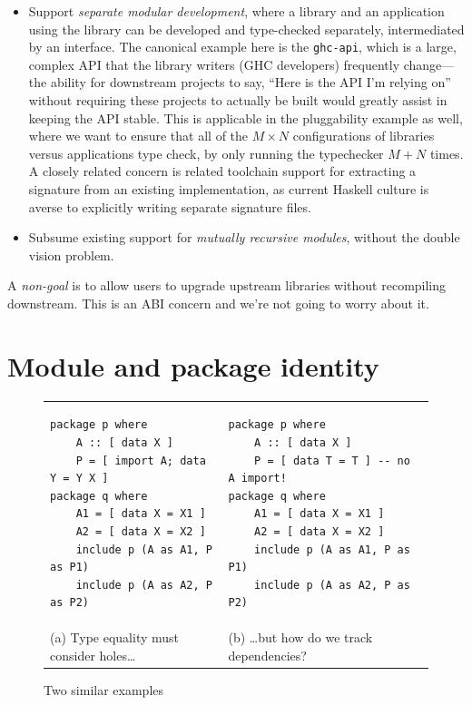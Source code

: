 \documentclass{article}
\begin{document}
\begin{itemize}
    \item Support \emph{separate modular development}, where a library and
        an application using the library can be developed and type-checked
        separately, intermediated by an interface.  The canonical example
        here is the \verb|ghc-api|, which is a large, complex API that
        the library writers (GHC developers) frequently change---the ability
        for downstream projects to say, ``Here is the API I'm relying on''
        without requiring these projects to actually be built would greatly
        assist in keeping the API stable. This is applicable in
        the pluggability example as well, where we want to ensure that all
        of the $M \times N$ configurations of libraries versus applications
        type check, by only running the typechecker $M + N$ times.  A closely
        related concern is related toolchain support for extracting a signature
        from an existing implementation, as current Haskell culture is averse
        to explicitly writing separate signature files.

    \item Subsume existing support for \emph{mutually recursive modules},
        without the double vision problem.
\end{itemize}

A \emph{non-goal} is to allow users to upgrade upstream libraries
without recompiling downstream. This is an ABI concern and we're not
going to worry about it.

\clearpage

\section{Module and package identity}

\begin{figure}[H]
\begin{tabular}{p{} p{}}
\begin{verbatim}
package p where
    A :: [ data X ]
    P = [ import A; data Y = Y X ]
package q where
    A1 = [ data X = X1 ]
    A2 = [ data X = X2 ]
    include p (A as A1, P as P1)
    include p (A as A2, P as P2)
\end{verbatim}
&
\begin{verbatim}
package p where
    A :: [ data X ]
    P = [ data T = T ] -- no A import!
package q where
    A1 = [ data X = X1 ]
    A2 = [ data X = X2 ]
    include p (A as A1, P as P1)
    include p (A as A2, P as P2)
\end{verbatim}
\\
(a) Type equality must consider holes\ldots &
(b) \ldots but how do we track dependencies? \\
\end{tabular}
\caption{Two similar examples}\label{fig:simple-ex}
\end{figure}
\end{document}
